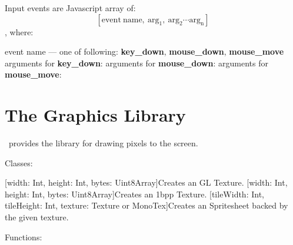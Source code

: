 Input events are Javascript array of: $$ [\mathrm{event\ name,\ arg_1,\ arg_2 \cdots arg_n}] $$, where:

\begin{outline}
\1event name --- one of following: \textbf{key\_down}, \textbf{mouse\_down}, \textbf{mouse\_move}
\1arguments for \textbf{key\_down}:
 \2
 \2
 \2
\1arguments for \textbf{mouse\_down}:
 \2
 \2
 \2
\1arguments for \textbf{mouse\_move}:
 \2
 \2
 \2
 \2
 \2
\end{outline}

\chapter{The Graphics Library}

\thedos\ provides the library for drawing pixels to the screen.


Classes:

\begin{outline}
\1[width: Int, height: Int, bytes: Uint8Array]{Creates an GL Texture.}
\1[width: Int, height: Int, bytes: Uint8Array]{Creates an 1bpp Texture.}
\1[tileWidth: Int, tileHeight: Int, texture: Texture or MonoTex]{Creates an Spritesheet backed by the given texture.}
\end{outline}

Functions:

